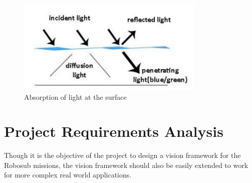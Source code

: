 \documentclass[fypca]{socreport}
\begin{document}
\begin{figure}[ht]
\centering

        \includegraphics[width=0.8\textwidth, height=0.2\textheight]{underwater_beerlambert.png}
        \caption{Absorption of light at the surface}
        \label{fig:water_surface_effect}

\end{figure}

\section{Project Requirements Analysis}
Though it is the objective of the project to design a vision framework
for the Robosub missions, the vision framework should also be easily
extended to work for more complex real world applications. 
\end{document}
